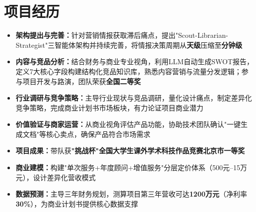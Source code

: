 \documentclass{resume}
\begin{document}
\section{项目经历}
\begin{itemize}[parsep=0.05ex]
  \item \textbf{架构提出与完善：}针对营销情报获取滞后痛点，提出"Scout-Librarian-Strategist"三智能体架构并持续完善，将情报决策周期从\textbf{天级}压缩至\textbf{分钟级}
  \item \textbf{内容与竞品分析：}结合财务与商业专业视角，利用LLM自动生成SWOT报告，定义7大核心字段构建结构化竞品知识库，熟悉内容营销与流量分发逻辑；参与项目开发与路演，团队荣获\textbf{全国二等奖}
\end{itemize}
\begin{itemize}[parsep=0.05ex]
  \item \textbf{行业调研与竞争策略：}主导行业现状与竞品调研，量化设计痛点，制定差异化竞争策略，完成商业计划书市场板块，有力论证项目商业潜力
  \item \textbf{价值验证与商家运营：}从商业视角评估产品功能，协助技术团队确认"一键生成文档"等核心卖点，确保产品符合市场需求
  \item \textbf{项目成果：}带队获\textbf{"挑战杯"全国大学生课外学术科技作品竞赛北京市一等奖}
\end{itemize}
\begin{itemize}[parsep=0.05ex]
  \item \textbf{商业建模：}构建"单次服务+年度顾问+增值服务"分层定价体系（500元--15万元），设计差异化营收模式
  \item \textbf{数据预测：}主导三年财务规划，测算项目第三年营收可达\textbf{1200万元}（净利率\textbf{30\%}），为商业计划书提供核心数据支撑
\end{itemize}
\end{document}
